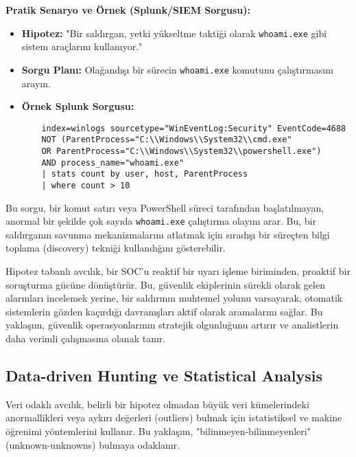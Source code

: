 \textbf{Pratik Senaryo ve Örnek (Splunk/SIEM Sorgusu):}

\begin{itemize}
    \item \textbf{Hipotez:} "Bir saldırgan, yetki yükseltme taktiği olarak \texttt{whoami.exe} gibi sistem araçlarını kullanıyor."
    \item \textbf{Sorgu Planı:} Olağandışı bir sürecin \texttt{whoami.exe} komutunu çalıştırmasını arayın.
    \item \textbf{Örnek Splunk Sorgusu:}
    \begin{verbatim}
    index=winlogs sourcetype="WinEventLog:Security" EventCode=4688 
    NOT (ParentProcess="C:\\Windows\\System32\\cmd.exe" 
    OR ParentProcess="C:\\Windows\\System32\\powershell.exe") 
    AND process_name="whoami.exe" 
    | stats count by user, host, ParentProcess 
    | where count > 10
    \end{verbatim}
\end{itemize}

Bu sorgu, bir komut satırı veya PowerShell süreci tarafından başlatılmayan, anormal bir şekilde çok sayıda \texttt{whoami.exe} çalıştırma olayını arar. Bu, bir saldırganın savunma mekanizmalarını atlatmak için sıradışı bir süreçten bilgi toplama (discovery) tekniği kullandığını gösterebilir.

Hipotez tabanlı avcılık, bir SOC'u reaktif bir uyarı işleme biriminden, proaktif bir soruşturma gücüne dönüştürür. Bu, güvenlik ekiplerinin sürekli olarak gelen alarmları incelemek yerine, bir saldırının muhtemel yolunu varsayarak, otomatik sistemlerin gözden kaçırdığı davranışları aktif olarak aramalarını sağlar. Bu yaklaşım, güvenlik operasyonlarının stratejik olgunluğunu artırır ve analistlerin daha verimli çalışmasına olanak tanır.

\subsection{Data-driven Hunting ve Statistical Analysis}

Veri odaklı avcılık, belirli bir hipotez olmadan büyük veri kümelerindeki anormallikleri veya aykırı değerleri (outliers) bulmak için istatistiksel ve makine öğrenimi yöntemlerini kullanır. Bu yaklaşım, "bilinmeyen-bilinmeyenleri" (unknown-unknowns) bulmaya odaklanır.

